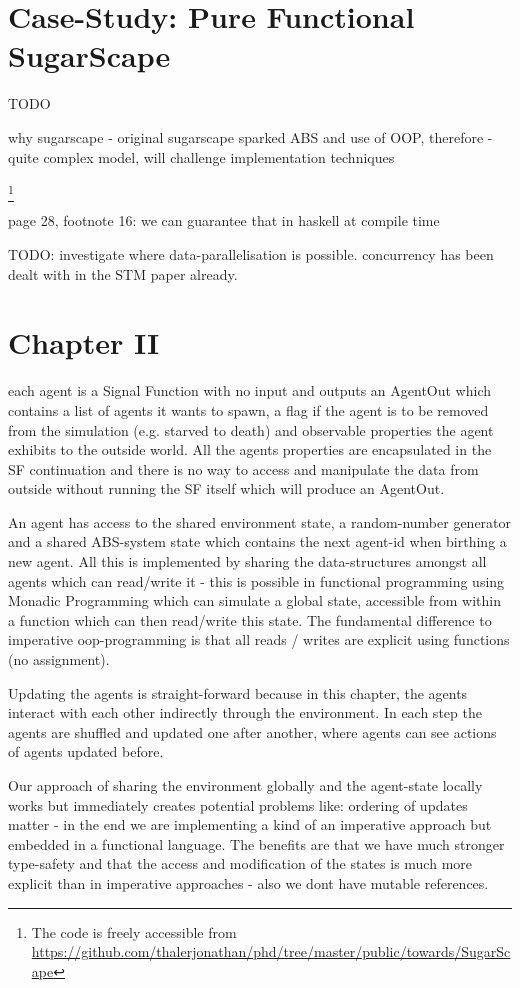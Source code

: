 \section{Case-Study: Pure Functional SugarScape}
TODO

why sugarscape
- original sugarscape sparked ABS and use of OOP, therefore 
- quite complex model, will challenge implementation techniques

\footnote{The code is freely accessible from \url{https://github.com/thalerjonathan/phd/tree/master/public/towards/SugarScape}}

\cite{weaver_replicating_nodate}

page 28, footnote 16: we can guarantee that in haskell at compile time

TODO: investigate where data-parallelisation is possible. concurrency has been dealt with in the STM paper already.

\section{Chapter II}
each agent is a Signal Function with no input and outputs an AgentOut which contains a list of agents it wants to spawn, a flag if the agent is to be removed from the simulation (e.g. starved to death) and observable properties the agent exhibits to the outside world. All the agents properties are encapsulated in the SF continuation and there is no way to access and manipulate the data from outside without running the SF itself which will produce an AgentOut.

An agent has access to the shared environment state, a random-number generator and a shared ABS-system state which contains the next agent-id when birthing a new agent. All this is implemented by sharing the data-structures amongst all agents which can read/write it - this is possible in functional programming using Monadic Programming which can simulate a global state, accessible from within a function which can then read/write this state. The fundamental difference to imperative oop-programming is that all reads / writes are explicit using functions (no assignment).

Updating the agents is straight-forward because in this chapter, the agents interact with each other indirectly through the environment. In each step the agents are shuffled and updated one after another, where agents can see actions of agents updated before. 

Our approach of sharing the environment globally and the agent-state locally works but immediately creates potential problems like: ordering of updates matter - in the end we are implementing a kind of an imperative approach but embedded in a functional language. The benefits are that we have much stronger type-safety and that the access and modification of the states is much more explicit than in imperative approaches - also we dont have mutable references.

